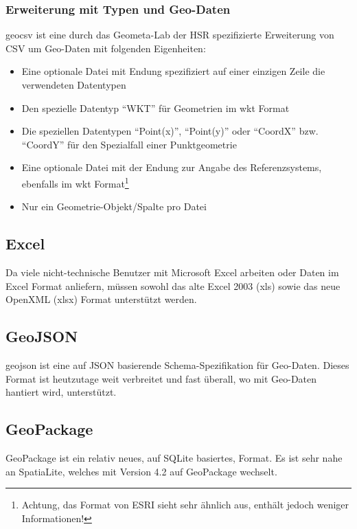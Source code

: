 \subsubsection{Erweiterung mit Typen und Geo-Daten}

\gls{geocsv} ist eine durch das Geometa-Lab der HSR spezifizierte Erweiterung von CSV um Geo-Daten mit folgenden Eigenheiten\cite{sfkeller,geocsv,gdal-csv}:

\begin{itemize}
\item Eine optionale Datei mit Endung  spezifiziert auf einer einzigen Zeile die verwendeten Datentypen
\item Den spezielle Datentyp ``WKT'' für Geometrien im \gls{wkt} Format
\item Die speziellen Datentypen ``Point(x)'', ``Point(y)'' oder ``CoordX'' bzw. ``CoordY'' für den Spezialfall einer Punktgeometrie
\item Eine optionale Datei mit der Endung  zur Angabe des Referenzsystems, ebenfalls im \gls{wkt} Format\footnote{Achtung, das  Format von ESRI sieht sehr ähnlich aus, enthält jedoch weniger Informationen!}
\item Nur ein Geometrie-Objekt/Spalte pro Datei
\end{itemize}


\subsection{Excel}
Da viele nicht-technische Benutzer mit Microsoft Excel arbeiten\cite{sfkeller} oder Daten im Excel Format anliefern, müssen sowohl das alte Excel 2003 (xls) sowie das neue OpenXML (xlsx) Format unterstützt werden.

\subsection{GeoJSON}
\gls{geojson} ist eine auf JSON basierende Schema-Spezifikation für Geo-Daten. Dieses Format ist heutzutage weit verbreitet und fast überall, wo mit Geo-Daten hantiert wird, unterstützt.

\subsection{GeoPackage}
GeoPackage ist ein relativ neues, auf SQLite basiertes, Format. Es ist sehr nahe an SpatiaLite, welches mit Version 4.2 auf GeoPackage wechselt.

